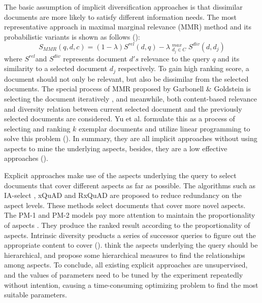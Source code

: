 \documentclass[review]{elsarticle}
\newcommand\revised[1]{{\color{black} #1}}
\begin{document}
\revised{
 The basic assumption of implicit diversification approaches is that dissimilar documents are more likely to satisfy different information needs. The most representative approach in maximal marginal relevance (MMR) method and its probabilistic variants is shown as follows (\cite{zhai2003beyond}):
\begin{equation}
S_{MMR}(q,d,c) = (1-\lambda)S^{rel}(d,q) - \lambda \mathop{}_{d_j \in C}^{max}   S^{div}(d,d_{j})
\end{equation}
where $ S^{rel}  $and $ S^{div}  $ represents  document $d's$ relevance to the query $q$ and its similarity to a selected document $d_{j}$ respectively. To gain high ranking score, a document should not only be relevant, but also be dissimilar from the selected documents.
The special process of MMR proposed by Garbonell \& Goldstein is selecting the document iteratively \cite{carbonell1998use}, and meanwhile, both content-based relevance and diversity relation between current selected document and the previously selected documents are considered. Yu et al. formulate this as a process of selecting and ranking $k$ exemplar documents and utilize linear programming to solve this problem (\cite{Yu:2017:CIL:3018661.3018710}).
In summary, they are all implicit approaches without using aspects to mine the underlying aspects, besides, they are a low effective approaches (\cite{santos2010exploiting,drosou2010search}).


Explicit approaches make use of the aspects underlying the query to select documents that cover different aspects as far as possible. The algorithms such as IA-select \cite{agrawal2009diversifying}, xQuAD \cite{santos2010exploiting} and RxQuAD \cite{vargas2012explicit} are proposed to reduce redundancy on the aspect levels. These methods select documents that cover more novel aspects. The PM-1 and PM-2 models pay more attention to maintain the proportionality of aspects \cite{dang2012diversity}. They produce the ranked result according to the proportionality of aspects. Intrinsic diversity products a series of successor queries to figure out the appropriate content to cover (\cite{raman2013toward}). \cite{Wang:2016:ESR:2911451.2911497,Hu15searchresult} think the aspects underlying the query should be hierarchical, and propose some hierarchical measures to find the relationships among aspects.
To conclude, all existing explicit approaches are unsupervised, and the values of parameters need to be tuned by the experiment repeatedly without intention, causing a time-consuming optimizing problem to find the most suitable parameters.

}
\end{document}
